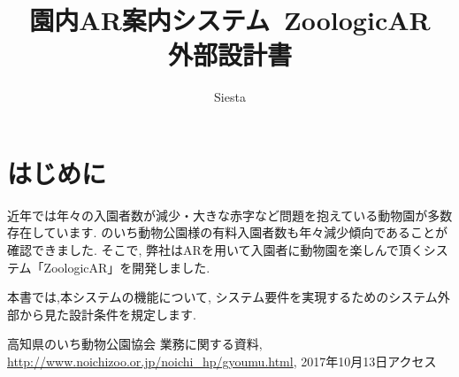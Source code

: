 \documentclass[a4j]{jarticle}
\title{
\vspace{30mm}
{\bf 園内AR案内システム~ZoologicAR} 
\\
\vspace{10mm}
{\bf 外部設計書}
\vspace{90mm}
}
\author{
\vspace{5mm}
Siesta \\
}
\begin{document}
\maketitle

\newpage

\tableofcontents

\newpage

\section{はじめに}
近年では年々の入園者数が減少・大きな赤字など問題を抱えている動物園が多数存在しています.
のいち動物公園様の有料入園者数も年々減少傾向であることが確認できました. 
そこで, 弊社はARを用いて入園者に動物園を楽しんで頂くシステム「ZoologicAR」を開発しました\cite{bibi1}.

本書では,本システムの機能について, システム要件を実現するためのシステム外部から見た設計条件を規定します.



\begin{thebibliography}{9}  
  高知県のいち動物公園協会 業務に関する資料, \url{http://www.noichizoo.or.jp/noichi_hp/gyoumu.html}, 2017年10月13日アクセス

\end{thebibliography}
\end{document}
